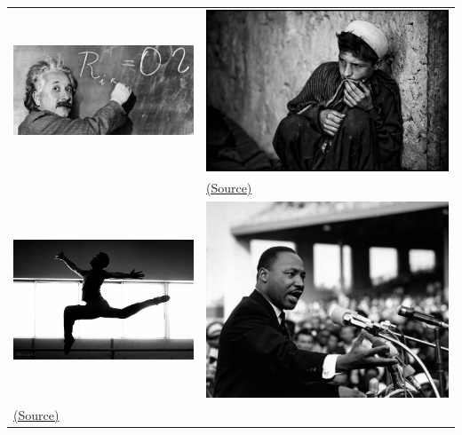 \documentclass[10pt,compress]{beamer} %
\begin{document}
\begin{frame}[plain]{}
	\begin{tabular}{ll}
		\includegraphics[width=0.4\linewidth]{figs/einstein.jpg} & \includegraphics[width=0.4\linewidth]{figs/empatia.jpg} \\ 
  	 & \tiny{\href{https://www.flickr.com/photos/zoriah/5741923543/in/photolist-9KoRPM-4uuLxz-jysFM-7MFnqH-azjwr-GcuDW-a13kEq-7jSbrA-4mNb6B-4FSbEW-8vEXcj-8P76u6-5gzcMn-uRkEwG-8sY6E2-iXsoin-52Ziee-8nZs5P-nPNSsY-4pnbRo-cqAWZS-4xLGVS-4VabYG-iYCeww-dRSst2-4pC3KR-EWEMN-eoZgzx-d7q5Vj-5CV6Zm-d7qgE9-4Z444F-4K9Ycz-6Em2P-fKWK3J-38tp9W-8P4JXn-7j3p1L-5z8FrL-srdMQB-orscLa-7rrrPy-dRKSp3-AmNGy6-6iobyU-8S4w4d-kiZssW-dAEM7S-5gDxL9-dDNBfB/}{(Source)}}     \\ 
		\includegraphics[width=0.4\linewidth]{figs/jump.jpg} & \includegraphics[width=0.4\linewidth]{figs/martin-luther-king.jpg} \\ 
  	\tiny{\href{https://www.flickr.com/photos/aldotapia/8171337460/in/photolist-ds5eWC-8NG6LL-cH4tWE-cH4txy-cH4ts5-8NG7aU-cH4sZE-cuYmRf-8ND1J6-8ND1GH-cbt1vd-9pQm6z-cbt2xS-cbsYuJ-cbsYFd-cbsXkb-cbt1LW-nwrd7b-CQGFK-6ACqW6-rfj43P-chqF2s-5ggjXu-8ND1V2-8NG77f-6B7mzx-8NG7eo-8NG75L-8ND1Mr-8ND1Q6-5345tB-zDkboz-ceqAoY-jhv4Zb-BixwUf-9KVNqY-8vxrrD-sTXGfX-fkuc7V-8vxrqM-CQGFW-ceqDd5-aUoPiZ-ceqGTG-5g3N1u-cdJqjq-e58ZyN-3remmb-95eTYM-ezDHvV/}{(Source)}} &   \\ 
	\end{tabular}
\end{frame}
\end{document}
